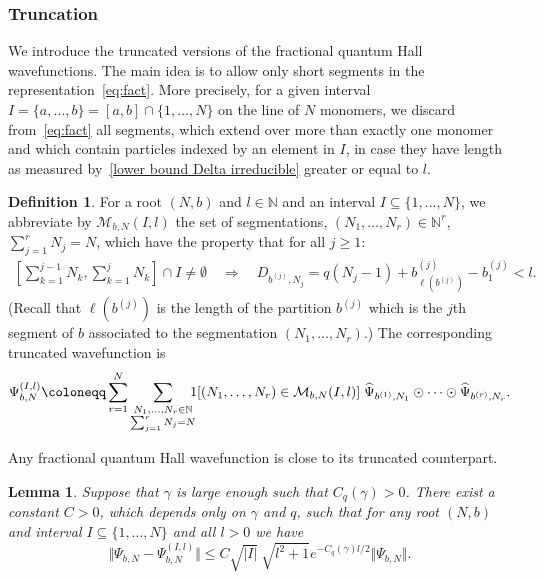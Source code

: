 \documentclass[letterpaper, DIV=17]{scrartcl}
\newtheorem{lemma}[theorem]{Lemma}
\numberwithin{equation}{section}
\theoremstyle{definition}
\newtheorem{defn}{Definition}[section]
\begin{document}
\subsubsection{Truncation}	We introduce the truncated versions of the fractional quantum Hall wavefunctions. The main idea is to allow only short segments in the representation~\eqref{eq:fact}. More precisely, 
for a given interval $I = \{a, \dots, b\}=[a,b]\cap \{1, \dots, N\}$ on the line of $ N $ monomers,  we discard from~\eqref{eq:fact} all segments, which extend over more than exactly one monomer and which contain particles indexed by an element in $I$, in case they have length as measured by~\eqref{lower bound Delta irreducible} greater or equal to $l $. %
\begin{defn}
For a root $ (N,b) $ and  $ l \in \mathbb{N} $ and  an interval $I \subseteq \{1, \dots, N\}$, we abbreviate by $\mathcal{M}_{ b, N}(I,l )$ the set of segmentations, $(N_1, \dots, N_r) \in \mathbb{N}^r $,  $\sum_{j=1}^r N_j=N$, which have the property that for all $ j \geq 1 $:
\begin{align*}
	\left[ \sum_{k=1}^{j-1} N_k, \sum_{k=1}^j N_k\right] \cap I \neq \emptyset \quad \Rightarrow \quad D_{b^{(j)}, N_j} = q(N_j-1)+ b^{(j)}_{\ell(b^{(j)})}-b^{(j)}_1 < l .
\end{align*}
(Recall that $ \ell(b^{(j)}) $ is the length of the partition $ b^{(j)} $ which is the $j $th segment of $ b $ associated to the segmentation $(N_1, \dots, N_r)$.)
%
The corresponding truncated wavefunction  is
\begin{equation}\label{eq:truncfact}
	\Psi_{b,N}^{(I, l)} \coloneqq \sum_{r=1}^{N} \sum_{ \substack{N_1, \dots , N_r \in \mathbb{N}\\  \sum_{j=1}^r N_j = N } } \mkern-10mu 1[(N_1, \dots, N_r)\in \mathcal{M}_{ b,N}(I, l )] \; \widehat \Psi_{b^{(1)},N_1} \odot   \cdots \odot  \widehat \Psi_{b^{(r)},N_r}.
\end{equation}
\end{defn}
Any fractional quantum Hall wavefunction is close to its truncated counterpart. 
%
\begin{lemma} \label{lm:truncated Laughlin}
	Suppose that $ \gamma $ is large enough such that $ C_q(\gamma) > 0 $. 
	There exist a constant $C>0$, which  depends only on $\gamma$ and $q$, such that for any root $ (N,b) $ and interval $I \subseteq \{1, \dots, N\}$ and all $l>0$ 
	we have
	\begin{equation}
		\Vert \Psi_{b,N} - \Psi_{b,N}^{(I, l)} \Vert \leq C\sqrt{|I|} \ \sqrt{l^2+1} e^{-C_q(\gamma) l/2} \Vert \Psi_{b,N}\Vert.
	\end{equation}
\end{lemma}
\end{document}
